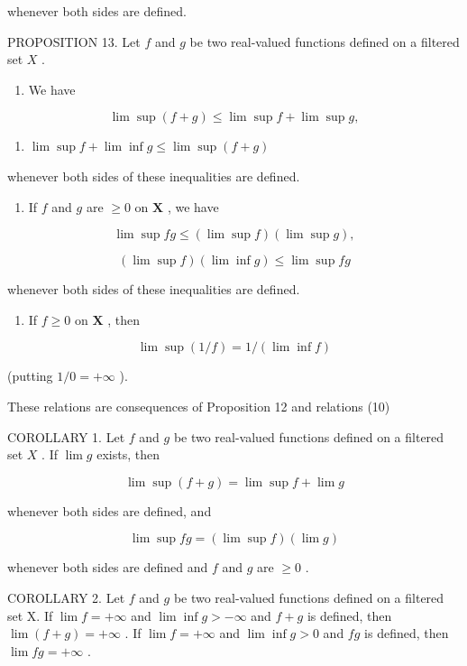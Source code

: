 whenever both sides are defined.

PROPOSITION 13. Let \(f\) and \(g\) be two real-valued functions defined on a filtered set \(X\) .

\begin{enumerate}
\def\labelenumi{(\roman{enumi})}
\tightlist
\item
  We have
\end{enumerate}

\[
\lim \sup (f + g) \leqslant \lim \sup f + \lim \sup g, \tag {28}
\]

\begin{enumerate}
\def\labelenumi{(\arabic{enumi})}
\setcounter{enumi}{28}
\tightlist
\item
  \(\lim \sup f + \lim \inf g \leqslant \lim \sup (f + g)\)
\end{enumerate}

whenever both sides of these inequalities are defined.

\begin{enumerate}
\def\labelenumi{(\roman{enumi})}
\setcounter{enumi}{1}
\tightlist
\item
  If \(f\) and \(g\) are \(\geqslant 0\) on \(\mathbf{X}\) , we have
\end{enumerate}

\[
\lim \sup f g \leqslant (\lim \sup f) (\lim \sup g), \tag {30}
\]

\[
(\lim \sup f) (\lim \inf g) \leqslant \lim \sup f g \tag {31}
\]

whenever both sides of these inequalities are defined.

\begin{enumerate}
\def\labelenumi{(\roman{enumi})}
\setcounter{enumi}{2}
\tightlist
\item
  If \(f \geqslant 0\) on \(\mathbf{X}\) , then
\end{enumerate}

\[
\lim \sup (1 / f) = 1 / (\lim \inf f)\tag{32}
\]

(putting \(1 / 0 = +\infty\) ).

These relations are consequences of Proposition 12 and relations (10)

COROLLARY 1. Let \(f\) and \(g\) be two real-valued functions defined on a filtered set \(X\) . If \(\lim g\) exists, then

\[
\lim \sup (f + g) = \lim \sup f + \lim g \tag {33}
\]

whenever both sides are defined, and

\[
\lim \sup f g = (\lim \sup f) (\lim g) \tag {34}
\]

whenever both sides are defined and \(f\) and \(g\) are \(\geqslant 0\) .

COROLLARY 2. Let \(f\) and \(g\) be two real-valued functions defined on a filtered set X. If \(\lim f = +\infty\) and \(\lim \inf g > -\infty\) and \(f + g\) is defined, then \(\lim (f + g) = +\infty\) . If \(\lim f = +\infty\) and \(\lim \inf g > 0\) and \(fg\) is defined, then \(\lim fg = +\infty\) .

